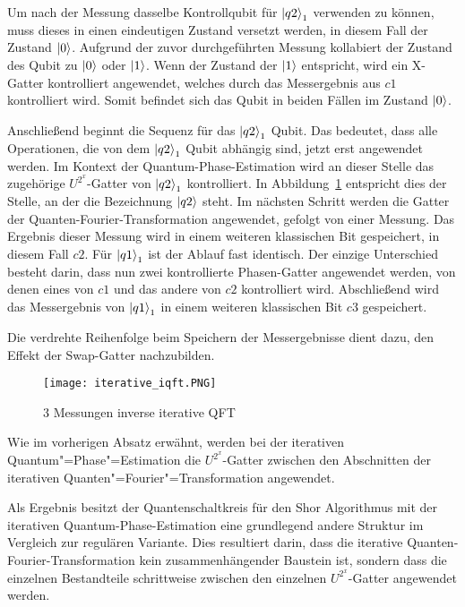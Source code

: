 Um nach der Messung dasselbe Kontrollqubit für \(\ket{q2}_1\) verwenden zu können, 
muss dieses in einen eindeutigen Zustand versetzt werden, 
in diesem Fall der Zustand \(\ket{0}\).
Aufgrund der zuvor durchgeführten Messung 
kollabiert der Zustand des Qubit zu \(\ket{0}\) oder \(\ket{1}\). 
Wenn der Zustand der \(\ket{1}\) entspricht, 
wird ein X-Gatter kontrolliert angewendet, 
welches durch das Messergebnis aus \(c1\) kontrolliert wird. 
Somit befindet sich das Qubit in beiden Fällen im Zustand \(\ket{0}\).

Anschließend beginnt die Sequenz für das \(\ket{q2}_1\) Qubit.
Das bedeutet, dass alle Operationen, die von dem \(\ket{q2}_1\) Qubit abhängig sind, 
jetzt erst angewendet werden.
Im Kontext der Quantum-Phase-Estimation wird an dieser Stelle das zugehörige \(U^{2^x}\)-Gatter von \(\ket{q2}_1\) kontrolliert.
In Abbildung~\ref{fig:iterative_iQFT} entspricht dies der Stelle, an der die Bezeichnung \(\ket{q2}\) steht.
Im nächsten Schritt werden die Gatter der Quanten-Fourier-Transformation angewendet, gefolgt von einer Messung. 
Das Ergebnis dieser Messung wird in einem weiteren klassischen Bit gespeichert, in diesem Fall \(c2\).
Für \(\ket{q1}_1\) ist der Ablauf fast identisch.
Der einzige Unterschied besteht darin, 
dass nun zwei kontrollierte Phasen-Gatter angewendet werden, 
von denen eines von \(c1\) und das andere von \(c2\) kontrolliert wird.
Abschließend wird das Messergebnis von \(\ket{q1}_1\) in einem weiteren klassischen Bit \(c3\) gespeichert.

Die verdrehte Reihenfolge beim Speichern der Messergebnisse dient dazu, 
den Effekt der Swap-Gatter nachzubilden.
\begin{figure}[H]
  \centering
  \texttt{[image: iterative\_iqft.PNG]}
  \caption{3 Messungen inverse iterative QFT}
  \label{fig:iterative_iQFT}
\end{figure}
  
Wie im vorherigen Absatz erwähnt, 
werden bei der iterativen Quantum"=Phase"=Estimation die \(U^{2^x}\)-Gatter zwischen den Abschnitten 
der iterativen Quanten"=Fourier"=Transformation angewendet. 

Als Ergebnis besitzt der Quantenschaltkreis für den Shor Algorithmus mit der iterativen Quantum-Phase-Estimation eine grundlegend andere Struktur 
im Vergleich zur regulären Variante.
Dies resultiert darin, dass die iterative Quanten-Fourier-Transformation kein zusammenhängender Baustein ist, 
sondern dass die einzelnen Bestandteile schrittweise zwischen 
den einzelnen \(U^{2^x}\)-Gatter angewendet werden.


